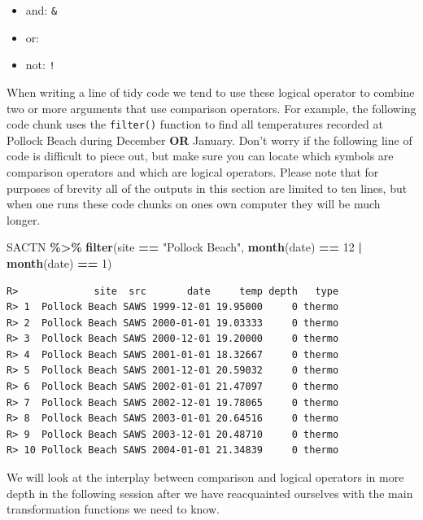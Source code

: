 \documentclass[
]{book}
\newenvironment{Shaded}{\begin{snugshade}}{\end{snugshade}}
\newcommand{\DecValTok}[1]{\textcolor[rgb]{0.00,0.00,0.81}{#1}}
\newcommand{\KeywordTok}[1]{\textcolor[rgb]{0.13,0.29,0.53}{\textbf{#1}}}
\newcommand{\NormalTok}[1]{#1}
\newcommand{\OperatorTok}[1]{\textcolor[rgb]{0.81,0.36,0.00}{\textbf{#1}}}
\newcommand{\StringTok}[1]{\textcolor[rgb]{0.31,0.60,0.02}{#1}}
\providecommand{\tightlist}{%
  \setlength{\itemsep}{0pt}\setlength{\parskip}{0pt}}
\begin{document}
\begin{itemize}
\tightlist
\item
  and: \texttt{\&}\\
\item
  or: \texttt{\textbar{}}\\
\item
  not: \texttt{!}
\end{itemize}

When writing a line of tidy code we tend to use these logical operator to combine two or more arguments that use comparison operators. For example, the following code chunk uses the \texttt{filter()} function to find all temperatures recorded at Pollock Beach during December \textbf{OR} January. Don't worry if the following line of code is difficult to piece out, but make sure you can locate which symbols are comparison operators and which are logical operators. Please note that for purposes of brevity all of the outputs in this section are limited to ten lines, but when one runs these code chunks on ones own computer they will be much longer.

\begin{Shaded}
\begin{Highlighting}[]
\NormalTok{SACTN }\OperatorTok{\%>\%}\StringTok{ }
\StringTok{  }\KeywordTok{filter}\NormalTok{(site }\OperatorTok{==}\StringTok{ "Pollock Beach"}\NormalTok{, }\KeywordTok{month}\NormalTok{(date) }\OperatorTok{==}\StringTok{ }\DecValTok{12} \OperatorTok{|}\StringTok{ }\KeywordTok{month}\NormalTok{(date) }\OperatorTok{==}\StringTok{ }\DecValTok{1}\NormalTok{)}
\end{Highlighting}
\end{Shaded}

\begin{verbatim}
R>             site  src       date     temp depth   type
R> 1  Pollock Beach SAWS 1999-12-01 19.95000     0 thermo
R> 2  Pollock Beach SAWS 2000-01-01 19.03333     0 thermo
R> 3  Pollock Beach SAWS 2000-12-01 19.20000     0 thermo
R> 4  Pollock Beach SAWS 2001-01-01 18.32667     0 thermo
R> 5  Pollock Beach SAWS 2001-12-01 20.59032     0 thermo
R> 6  Pollock Beach SAWS 2002-01-01 21.47097     0 thermo
R> 7  Pollock Beach SAWS 2002-12-01 19.78065     0 thermo
R> 8  Pollock Beach SAWS 2003-01-01 20.64516     0 thermo
R> 9  Pollock Beach SAWS 2003-12-01 20.48710     0 thermo
R> 10 Pollock Beach SAWS 2004-01-01 21.34839     0 thermo
\end{verbatim}

We will look at the interplay between comparison and logical operators in more depth in the following session after we have reacquainted ourselves with the main transformation functions we need to know.
\end{document}

